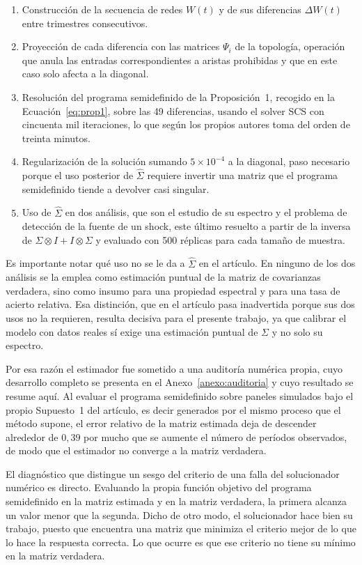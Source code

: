 \begin{enumerate}
    \item Construcción de la secuencia de redes $W(t)$ y de sus diferencias
    $\Delta W(t)$ entre trimestres consecutivos.
    \item Proyección de cada diferencia con las matrices $\Psi_i$ de la
    topología, operación que anula las entradas correspondientes a aristas
    prohibidas y que en este caso solo afecta a la diagonal.
    \item Resolución del programa semidefinido de la Proposición~1, recogido en
    la Ecuación~\eqref{eq:prop1}, sobre las 49 diferencias, usando el solver SCS
    con cincuenta mil iteraciones, lo que según los propios autores toma del
    orden de treinta minutos.
    \item Regularización de la solución sumando $5\times 10^{-4}$ a la diagonal,
    paso necesario porque el uso posterior de $\hat\Sigma$ requiere invertir una
    matriz que el programa semidefinido tiende a devolver casi singular.
    \item Uso de $\hat\Sigma$ en dos análisis, que son el estudio de su espectro
    y el problema de detección de la fuente de un shock, este último resuelto a
    partir de la inversa de $\Sigma\otimes I + I\otimes\Sigma$ y evaluado con 500
    réplicas para cada tamaño de muestra.
\end{enumerate}

Es importante notar qué uso no se le da a $\hat\Sigma$ en el artículo. En ninguno de los dos análisis se la emplea como estimación puntual de la matriz de covarianzas verdadera, sino como insumo para una propiedad espectral y para una tasa de acierto relativa. Esa distinción, que en el artículo pasa inadvertida porque sus dos usos no la requieren, resulta decisiva para el presente trabajo, ya que calibrar el modelo con datos reales sí exige una estimación puntual de $\Sigma$ y no solo su espectro.

Por esa razón el estimador fue sometido a una auditoría numérica propia, cuyo desarrollo completo se presenta en el Anexo~\ref{anexo:auditoria} y cuyo resultado se resume aquí. Al evaluar el programa semidefinido sobre paneles simulados bajo el propio Supuesto~1 del artículo, es decir generados por el mismo proceso que el método supone, el error relativo de la matriz estimada deja de descender alrededor de $0{,}39$ por mucho que se aumente el número de períodos observados, de modo que el estimador no converge a la matriz verdadera.

El diagnóstico que distingue un sesgo del criterio de una falla del solucionador numérico es directo. Evaluando la propia función objetivo del programa semidefinido en la matriz estimada y en la matriz verdadera, la primera alcanza un valor menor que la segunda. Dicho de otro modo, el solucionador hace bien su trabajo, puesto que encuentra una matriz que minimiza el criterio mejor de lo que lo hace la respuesta correcta. Lo que ocurre es que ese criterio no tiene su mínimo en la matriz verdadera.

